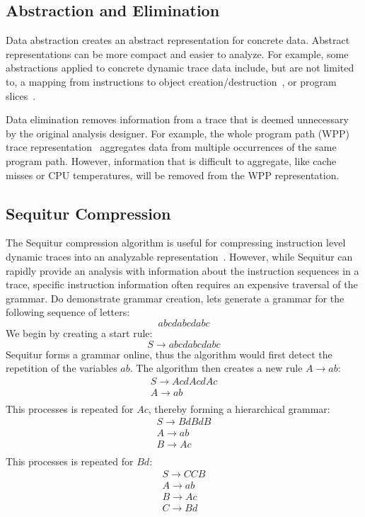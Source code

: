 {\subsection{Abstraction and Elimination}

Data abstraction creates an abstract representation for concrete data. Abstract representations can be more compact and easier to analyze. For example, some abstractions applied to concrete dynamic trace data include, but are not limited to, a mapping from instructions to object creation/destruction~\cite{sridharan:07:pldi}, or program slices~\cite{zhang:04:icse}.

Data elimination removes information from a trace that is deemed unnecessary by the original analysis designer.  For example, the whole program path (WPP) trace representation~\cite{larus:99:pldi} aggregates data from multiple occurrences of the same program path.  However, information that is difficult to aggregate, like cache misses or CPU temperatures, will be removed from the WPP representation.

\subsection{Sequitur Compression}

The Sequitur compression algorithm is useful for compressing instruction level dynamic traces into an analyzable representation~\cite{manning:97:dcc}.  However, while Sequitur can rapidly provide an analysis with information about the instruction sequences in a trace, specific instruction information often requires an expensive traversal of the grammar.  Do demonstrate grammar creation, lets generate a grammar for the following sequence of letters: $$ abcdabcdabc $$ We begin by creating a start rule: $$ S \rightarrow abcdabcdabc $$ Sequitur forms a grammar online, thus the algorithm would first detect the repetition of the variables $ab$.  The algorithm then creates a new rule $A \rightarrow ab$: $$ \begin{array}{lcll} S \rightarrow AcdAcdAc\\ A \rightarrow ab\\ \end{array} $$ This processes is repeated for $Ac$, thereby forming a hierarchical grammar: $$ \begin{array}{lcll} S \rightarrow BdBdB\\ A \rightarrow ab\\ B \rightarrow Ac\\ \end{array} $$ This processes is repeated for $Bd$: $$ \begin{array}{lcll} S \rightarrow CCB\\ A \rightarrow ab\\ B \rightarrow Ac\\ C \rightarrow Bd\\ \end{array} $$

}
